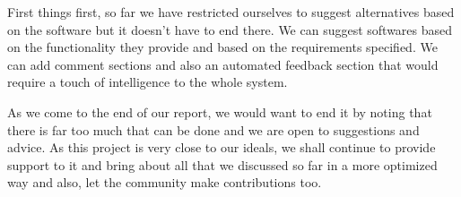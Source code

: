 First things first, so far we have restricted ourselves to suggest alternatives based on the software but it doesn't have to end there. We can suggest softwares based on the functionality they provide and based on the requirements specified. We can add comment sections and also an automated feedback section that would require a touch of intelligence to the whole system.

As we come to the end of our report, we would want to end it by noting that there is far too much that can be done and we are open to suggestions and advice. As this project is very close to our ideals, we shall continue to provide support to it and bring about all that we discussed so far in a more optimized way and also, let the community make contributions too.